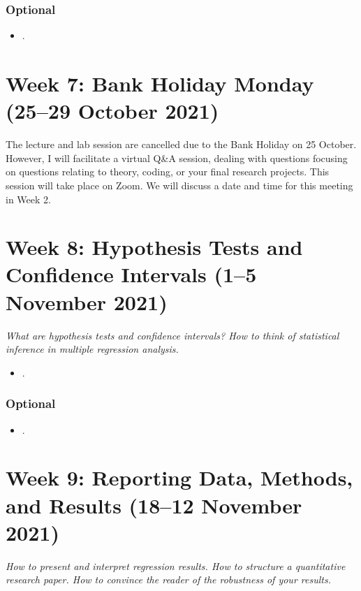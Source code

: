 \documentclass[abstract=on,parskip=full,headings=standardclasses,fontsize=11pt,paper=a4]{scrartcl}
\begin{document}
\subsubsection*{Optional}
\begin{itemize}
\item {}.
\end{itemize}


\section{Week 7:  Bank Holiday Monday  (25--29 October 2021)}

The lecture and lab session are cancelled due to the  Bank Holiday on 25 October. However, I will facilitate a virtual Q\&A session, dealing with questions focusing on questions relating to theory, coding, or your final research projects. This session will take place on Zoom. We will discuss a date and time for this meeting in Week 2.


\section{Week 8:  Hypothesis Tests and Confidence Intervals (1--5 November 2021)}


\textit{What are hypothesis tests and confidence intervals? How to think of statistical inference in multiple regression analysis.}


\begin{itemize}
\item {}.
\end{itemize}


\subsubsection*{Optional}
\begin{itemize}
\item {}.
\end{itemize}


\section{Week 9: Reporting Data, Methods, and Results (18--12 November 2021)}


\textit{How to present and interpret regression results. How to structure a quantitative research paper. How to convince the reader of the robustness of your results.}
\end{document}
